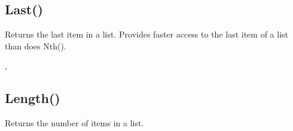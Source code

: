 \documentclass[letterpaper,10pt,english]{sphinxmanual}
\begin{document}
\ignorespaces 

\subsection{Last()}
\label{\detokenize{reference/pebllist:last}}\label{\detokenize{reference/pebllist:index-5}}
\sphinxAtStartPar
{}

\sphinxAtStartPar
{}

\sphinxAtStartPar
Returns the last item in a list. Provides faster                access to the last item of a list than does Nth().

\sphinxAtStartPar
{}

\begin{sphinxVerbatim}[commandchars=\\\{\}]
\end{sphinxVerbatim}

\sphinxAtStartPar
{}

\begin{sphinxVerbatim}[commandchars=\\\{\}]
\PYG{p}{[}\PYG{p}{]}
\end{sphinxVerbatim}

\sphinxAtStartPar
{}

\sphinxAtStartPar
{}, 

\ignorespaces 

\subsection{Length()}
\label{\detokenize{reference/pebllist:length}}\label{\detokenize{reference/pebllist:index-6}}
\sphinxAtStartPar
{}

\sphinxAtStartPar
{}

\sphinxAtStartPar
Returns the number of items in a list.

\sphinxAtStartPar
{}
\end{document}
